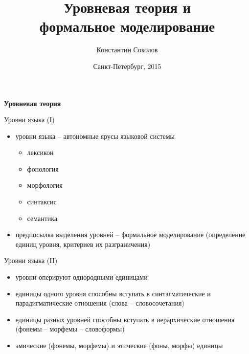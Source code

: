 \documentclass{beamer}
\begin{document}
\title{\large{\sc Уровневая теория и \\формальное моделирование}}
\author{Константин Соколов}
\date{Санкт-Петербург, 2015} 

\begin{frame}
    \thispagestyle{empty}
    \titlepage
\end{frame}

 

\begin{frame}{}
\begin{center}
	\textbf{Уровневая теория}
\end{center}
\end{frame}

\begin{frame}{Уровни языка (I)}
\setcounter{framenumber}{1}
\begin{itemize}
    \item уровни языка -- автономные ярусы языковой системы
    	\begin{itemize}
			\item лексикон
			\item фонология
			\item морфология
			\item синтаксис
			\item семантика    	
    	\end{itemize}
	\item предпосылка выделения уровней -- формальное моделирование (определение единиц уровня, критериев их разграничения)    	
\end{itemize}
\end{frame}

\begin{frame}{Уровни языка (II)}
\begin{itemize}
	\item уровни оперируют однородными единицами
	\item единицы одного уровня способны вступать в синтагматические и парадигматические отношения (слова -- словосочетания)
	\item единицы разных уровней способны вступать в иерархические отношения (фонемы -- морфемы -- словоформы)
	\item эмические (фонемы, морфемы) и этические (фоны, морфы) единицы 
\end{itemize}
\end{frame}
\end{document}
